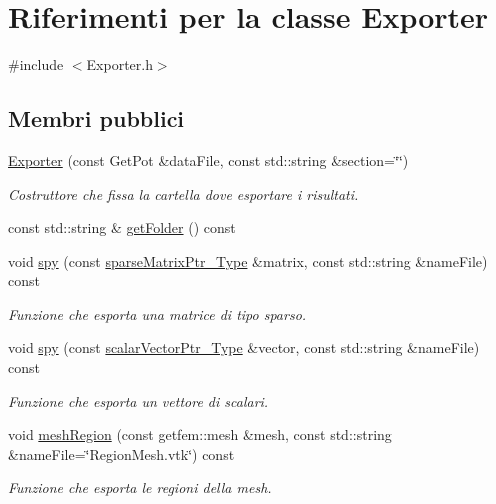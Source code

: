 \hypertarget{classExporter}{\section{Riferimenti per la classe Exporter}
\label{classExporter}
}


{\ttfamily \#include $<$Exporter.\-h$>$}

\subsection*{Membri pubblici}
\begin{DoxyCompactItemize}
\item 
\hyperlink{classExporter_a14a838ecbf8b9f5a370013430236081f}{Exporter} (const Get\-Pot \&data\-File, const std\-::string \&section=\char`\"{}\char`\"{})
\begin{DoxyCompactList}\small\item\em Costruttore che fissa la cartella dove esportare i risultati. \end{DoxyCompactList}\item 
const std\-::string \& \hyperlink{classExporter_a2771781a7f08fe8518973a6ba712a391}{get\-Folder} () const 
\item 
void \hyperlink{classExporter_a8ca0bdf8550569260ef4f3e39ab274dc}{spy} (const \hyperlink{Core_8h_a87137a9501b38c724ac80bc955164bb7}{sparse\-Matrix\-Ptr\-\_\-\-Type} \&matrix, const std\-::string \&name\-File) const 
\begin{DoxyCompactList}\small\item\em Funzione che esporta una matrice di tipo sparso. \end{DoxyCompactList}\item 
void \hyperlink{classExporter_ab5452c31e85ecfbbda8623aa20723e68}{spy} (const \hyperlink{Core_8h_ab09b6fa3c23db1b8c60456f8690c44a7}{scalar\-Vector\-Ptr\-\_\-\-Type} \&vector, const std\-::string \&name\-File) const 
\begin{DoxyCompactList}\small\item\em Funzione che esporta un vettore di scalari. \end{DoxyCompactList}\item 
void \hyperlink{classExporter_af02a2344019769ab23d9ac673a7b3709}{mesh\-Region} (const getfem\-::mesh \&mesh, const std\-::string \&name\-File=\char`\"{}Region\-Mesh.\-vtk\char`\"{}) const 
\begin{DoxyCompactList}\small\item\em Funzione che esporta le regioni della mesh. \end{DoxyCompactList}\end{DoxyCompactItemize}


